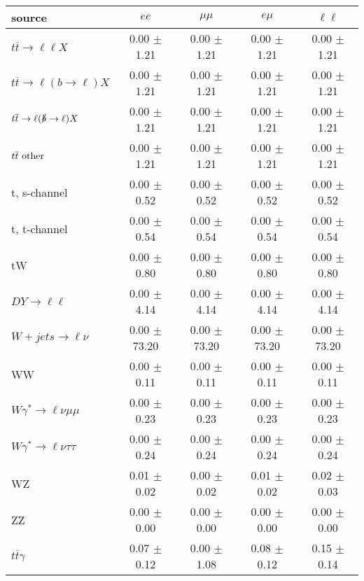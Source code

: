 \begin{tabular}{l|cccc} \hline\hline
source & $ee$ & $\mu\mu$ & $e\mu$ & $\ell\ell $ \\
\hline
$t\overline{t} \rightarrow \ell \ell X$ &  0.00 $\pm$  1.21 &  0.00 $\pm$  1.21 &  0.00 $\pm$  1.21 &  0.00 $\pm$  1.21 \\
$t\overline{t} \rightarrow \ell (b \rightarrow \ell) X$ &  0.00 $\pm$  1.21 &  0.00 $\pm$  1.21 &  0.00 $\pm$  1.21 &  0.00 $\pm$  1.21 \\
$t\overline{t} \rightarrow \ell (\slashed b \rightarrow \ell) X$ &  0.00 $\pm$  1.21 &  0.00 $\pm$  1.21 &  0.00 $\pm$  1.21 &  0.00 $\pm$  1.21 \\
        $t\overline{t}\ \rm{other}$ &  0.00 $\pm$  1.21 &  0.00 $\pm$  1.21 &  0.00 $\pm$  1.21 &  0.00 $\pm$  1.21 \\
\hline
                       t, s-channel &  0.00 $\pm$  0.52 &  0.00 $\pm$  0.52 &  0.00 $\pm$  0.52 &  0.00 $\pm$  0.52 \\
                       t, t-channel &  0.00 $\pm$  0.54 &  0.00 $\pm$  0.54 &  0.00 $\pm$  0.54 &  0.00 $\pm$  0.54 \\
                                 tW &  0.00 $\pm$  0.80 &  0.00 $\pm$  0.80 &  0.00 $\pm$  0.80 &  0.00 $\pm$  0.80 \\
\hline
         $DY \rightarrow \ell \ell$ &  0.00 $\pm$  4.14 &  0.00 $\pm$  4.14 &  0.00 $\pm$  4.14 &  0.00 $\pm$  4.14 \\
      $W+jets \rightarrow \ell \nu$ &  0.00 $\pm$ 73.20 &  0.00 $\pm$ 73.20 &  0.00 $\pm$ 73.20 &  0.00 $\pm$ 73.20 \\
                                 WW &  0.00 $\pm$  0.11 &  0.00 $\pm$  0.11 &  0.00 $\pm$  0.11 &  0.00 $\pm$  0.11 \\
\hline
$W\gamma^{*} \rightarrow \ell \nu \mu\mu$ &  0.00 $\pm$  0.23 &  0.00 $\pm$  0.23 &  0.00 $\pm$  0.23 &  0.00 $\pm$  0.23 \\
$W\gamma^{*} \rightarrow \ell \nu \tau\tau$ &  0.00 $\pm$  0.24 &  0.00 $\pm$  0.24 &  0.00 $\pm$  0.24 &  0.00 $\pm$  0.24 \\
                                 WZ &  0.01 $\pm$  0.02 &  0.00 $\pm$  0.02 &  0.01 $\pm$  0.02 &  0.02 $\pm$  0.03 \\
                                 ZZ &  0.00 $\pm$  0.00 &  0.00 $\pm$  0.00 &  0.00 $\pm$  0.00 &  0.00 $\pm$  0.00 \\
\hline
              $t\overline{t}\gamma$ &  0.07 $\pm$  0.12 &  0.00 $\pm$  1.08 &  0.08 $\pm$  0.12 &  0.15 $\pm$  0.14 \\

\end{tabular}

